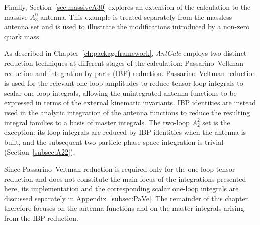 Finally, Section~\ref{sec:massiveA30} explores an extension of the calculation to the massive
$A_3^0$ antenna. This example is treated separately from the massless antenna set and is used to
illustrate the modifications introduced by a non-zero quark mass.

As described in Chapter~\ref{ch:packageframework}, \textit{AntCalc} employs two distinct
reduction techniques at different stages of the calculation: Passarino--Veltman reduction and
integration-by-parts (IBP) reduction. Passarino--Veltman reduction is used for the relevant one-loop
amplitudes to reduce tensor loop integrals to scalar one-loop integrals, allowing the unintegrated
antenna functions to be expressed in terms of the external kinematic invariants. IBP identities are
instead used in the analytic integration of the antenna functions to reduce the resulting integral
families to a basis of master integrals. The two-loop $A_2^2$ set is the exception: its loop integrals
are reduced by IBP identities when the antenna is built, and the subsequent two-particle phase-space
integration is trivial (Section~\ref{subsec:A22}).

Since Passarino--Veltman reduction is required only for the one-loop tensor reduction and does not
constitute the main focus of the integrations presented here, its implementation and the
corresponding scalar one-loop integrals are discussed separately in
Appendix~\ref{subsec:PaVe}. The remainder of this chapter therefore focuses on the antenna functions and
on the master integrals arising from the IBP reduction.

